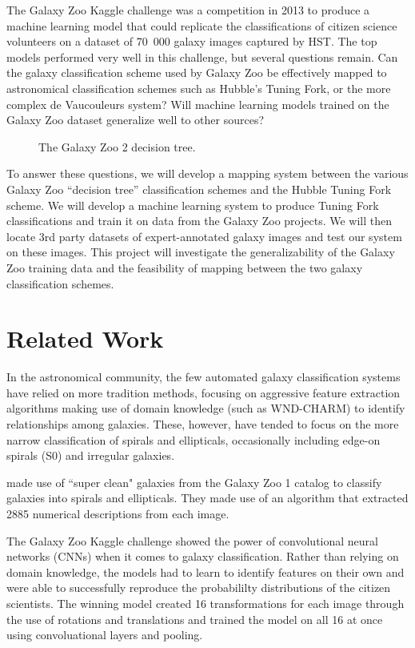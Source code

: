 \documentclass[twocolumn]{aastex6}
\begin{document}
The Galaxy Zoo Kaggle challenge was a competition in 2013 to produce a machine learning model that could replicate the classifications of citizen science volunteers on a dataset of 70 000 galaxy images captured by HST. The top models performed very well in this challenge, but several questions remain. Can the galaxy classification scheme used by Galaxy Zoo be effectively mapped to astronomical classification schemes such as Hubble's Tuning Fork, or the more complex de Vaucouleurs system? Will machine learning models trained on the Galaxy Zoo dataset generalize well to other sources? 

\begin{figure}[!b]
\caption{The Galaxy Zoo 2 decision tree.}
\label{fig:GZ2tree}
\end{figure}

To answer these questions, we will develop a mapping system between the various Galaxy Zoo “decision tree” classification schemes and the Hubble Tuning Fork scheme. We will develop a machine learning system to produce Tuning Fork classifications and train it on data from the Galaxy Zoo projects. We will then locate 3rd party datasets of expert-annotated galaxy images and test our system on these images. This project will investigate the generalizability of the Galaxy Zoo training data and the feasibility of mapping between the two galaxy classification schemes. 

\section{Related Work}
In the astronomical community, the few automated galaxy classification systems have relied on more tradition methods, focusing on aggressive feature extraction algorithms making use of domain knowledge (such as WND-CHARM) to identify relationships among galaxies. These, however, have tended to focus on the more narrow classification of spirals and ellipticals, occasionally including edge-on spirals (S0) and irregular galaxies.

\cite{2016ApJS..223...20K} made use of ``super clean" galaxies from the Galaxy Zoo 1 catalog \citep{2008MNRAS.389.1179L} to classify galaxies into spirals and ellipticals. They made use of an algorithm that extracted 2885 numerical descriptions from each image.

The Galaxy Zoo Kaggle challenge showed the power of convolutional neural networks (CNNs) when it comes to galaxy classification. Rather than relying on domain knowledge, the models had to learn to identify features on their own and were able to successfully reproduce the probabililty distributions of the citizen scientists. The winning model created 16 transformations for each image through the use of rotations and translations and trained the model on all 16 at once using convoluational layers and pooling.
\end{document}
